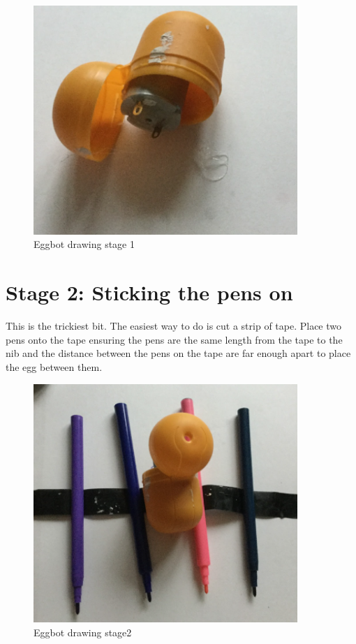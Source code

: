 \begin{figure}
    \centering
    \includegraphics[width=10cm]{chapters/ChapterP1/figures/eggbot_stage1.png}
    \caption{Eggbot drawing stage 1}
    \label{fig:Egggbotdrawing1}
\end{figure}

\section{Stage 2: Sticking the pens on}

This is the trickiest bit. The easiest way to do is cut a strip of tape. Place two pens onto the tape ensuring the pens are the same length from the tape to the nib and the distance between the pens on the tape are far enough apart to place the egg between them.

\begin{figure}
    \centering
    \includegraphics[width=10cm]{chapters/ChapterP1/figures/eggbot_stage2.png}
    \caption{Eggbot drawing stage2}
    \label{fig:Egggbotdrawing2}
\end{figure}

